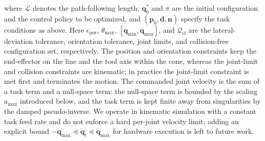 \documentclass[journal, twoside]{IEEEtran}
\begin{document}
where $\mathcal{L}$ denotes the path-following length, $\mathbf{q}_0^*$ and $\pi$ are the initial configuration and the control policy to be optimized, and $(\mathbf{p}_0, \mathbf{d}, \mathbf{n})$ specify the task conditions as above. Here $\epsilon_{\text{pos}}$, $\theta_{\max}$, $[\mathbf{q}_{\min}, \mathbf{q}_{\max}]$, and $\mathcal{Q}_{\mathrm{cf}}$ are the lateral-deviation tolerance, orientation tolerance, joint limits, and collision-free configuration set, respectively. The position and orientation constraints keep the end-effector on the line and the tool axis within the cone, whereas the joint-limit and collision constraints are kinematic; in practice the joint-limit constraint is met first and terminates the motion. The commanded joint velocity is the sum of a task term and a null-space term: the null-space term is bounded by the scaling $a_{\max}$ introduced below, and the task term is kept finite away from singularities by the damped pseudo-inverse. We operate in kinematic simulation with a constant task feed rate and do not enforce a hard per-joint velocity limit; adding an explicit bound $-\dot{\mathbf{q}}_{\max}\preceq\dot{\mathbf{q}}_{t}\preceq\dot{\mathbf{q}}_{\max}$ for hardware execution is left to future work.
\end{document}
